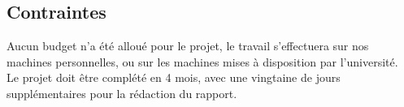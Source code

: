 \subsection{Contraintes}
Aucun budget n'a été alloué pour le projet, le travail s'effectuera sur nos machines personnelles, ou sur les machines mises à disposition par l'université.\\
Le projet doit être complété en 4 mois, avec une vingtaine de jours supplémentaires pour la rédaction du rapport.\\


\clearpage
